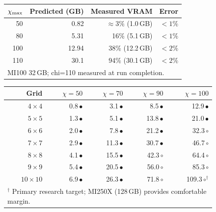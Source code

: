 \begin{figure}[ht]
\centering
{}
\label{tab:vram}
\smallskip
\begin{tabular}{rrrr}
\toprule
$\chi_{\mathrm{max}}$ & Predicted (GB) & Measured VRAM & Error \\
\midrule
 50 & 0.82  & $\approx 3\%$ (1.0\,GB)  & $< 1\%$ \\
 80 & 5.31  & 16\% (5.1\,GB)            & $< 1\%$ \\
100 & 12.94 & 38\% (12.2\,GB)           & $< 2\%$ \\
110 & 30.1  & 94\% (30.1\,GB)           & $< 2\%$ \\
\midrule
\multicolumn{4}{l}{MI100 32\,GB; chi=110 measured at run completion.} \\
\bottomrule
\end{tabular}
\bigskip
{}
\label{tab:vram_grid}
\smallskip
\begin{tabular}{r rrrr}
\toprule
Grid & $\chi=50$ & $\chi=70$ & $\chi=90$ & $\chi=100$ \\
\midrule
$4\times4$   & 0.8\,$\bullet$  &  3.1\,$\bullet$  &   8.5\,$\bullet$  &  12.9\,$\bullet$ \\
$5\times5$   & 1.3\,$\bullet$  &  5.1\,$\bullet$  &  13.8\,$\bullet$  &  21.0\,$\bullet$ \\
$6\times6$   & 2.0\,$\bullet$  &  7.8\,$\bullet$  &  21.2\,$\bullet$  &  32.3\,$\circ$   \\
$7\times7$   & 2.9\,$\bullet$  & 11.3\,$\bullet$  &  30.7\,$\bullet$  &  46.7\,$\circ$   \\
$8\times8$   & 4.1\,$\bullet$  & 15.5\,$\bullet$  &  42.3\,$\circ$    &  64.4\,$\circ$   \\
$9\times9$   & 5.4\,$\bullet$  & 20.5\,$\bullet$  &  56.0\,$\circ$    &  85.3\,$\circ$   \\
$10\times10$ & 6.9\,$\bullet$  & 26.3\,$\bullet$  &  71.8\,$\circ$    & 109.3\,$\circ$$^\dagger$ \\
\midrule
\multicolumn{5}{l}{$^\dagger$ Primary research target; MI250X (128\,GB) provides comfortable margin.} \\
\bottomrule
\end{tabular}
\end{figure}
